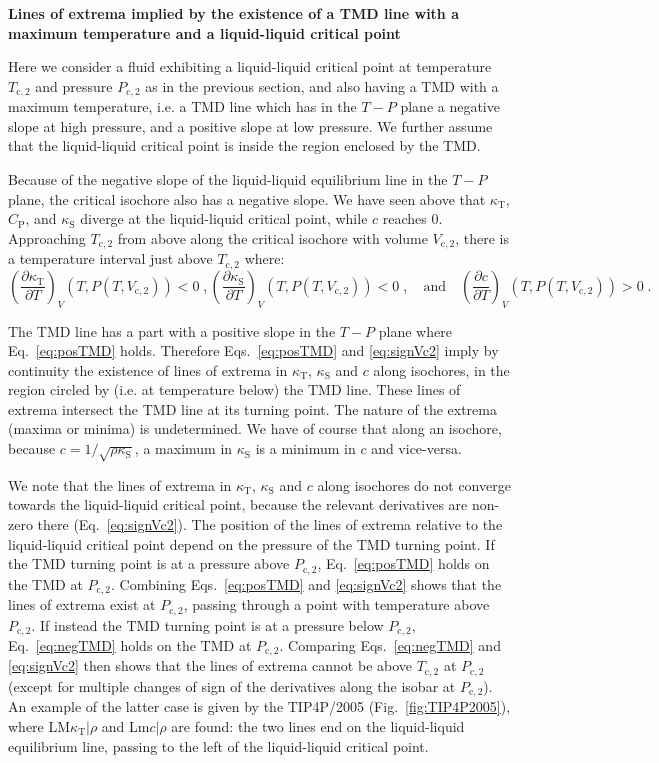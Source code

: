 \documentclass[12pt]{article}
\newcommand{\mrm}{\mathrm}
\newcommand{\kT}{\kappa_\mrm{T}}
\newcommand{\kS}{\kappa_\mrm{S}}
\newcommand{\CP}{C_\mrm{P}}
\begin{document}
\textbf{Lines of extrema implied by the existence of a TMD line with a maximum temperature and a liquid-liquid critical point}

Here we consider a fluid exhibiting a liquid-liquid critical point at temperature $T_\mrm{c,2}$ and pressure $P_\mrm{c,2}$ as in the previous section, and also having a 
TMD with a maximum temperature, i.e. a TMD line which has in the $T-P$ plane a negative slope at high pressure, and a positive slope at low pressure. We further assume that the liquid-liquid critical point is inside the region enclosed by the TMD.

Because of the negative slope of the liquid-liquid equilibrium line in the $T-P$ plane, the critical isochore also has a negative slope. We have seen above that $\kT$, $\CP$, and $\kS$ diverge at the liquid-liquid critical point, while $c$ reaches 0. Approaching $T_\mrm{c,2}$ from above along the critical isochore with volume $V_\mrm{c,2}$, there is a temperature interval just above $T_\mrm{c,2}$ where:
\begin{equation}
\left( \frac{\partial \kT}{\partial T} \right)_V (T,P(T,V_\mrm{c,2})) < 0 \; , \left( \frac{\partial \kS}{\partial T} \right)_V (T,P(T,V_\mrm{c,2})) < 0 \; , \quad\mrm{and}\quad \left( \frac{\partial c}{\partial T} \right)_V (T,P(T,V_\mrm{c,2})) > 0 \; .
\label{eq:signVc2}
\end{equation}

The TMD line has a part with a positive slope in the $T-P$ plane where Eq.~\ref{eq:posTMD} holds. Therefore Eqs.~\ref{eq:posTMD} and \ref{eq:signVc2} imply by continuity the existence of lines of extrema in $\kT$, $\kS$ and $c$ along isochores, in the region circled by (i.e. at temperature below) the TMD line. These lines of extrema intersect the TMD line at its turning point. The nature of the extrema (maxima or minima) is undetermined. We have of course that along an isochore, because $c=1/\sqrt{\rho \kS}$, a maximum in $\kS$ is a minimum in $c$ and vice-versa.

We note that the lines of extrema in $\kT$, $\kS$ and $c$ along isochores do not converge towards the liquid-liquid critical point, because the relevant derivatives are non-zero there (Eq.~\ref{eq:signVc2}). The position of the lines of extrema relative to the liquid-liquid critical point depend on the pressure of the TMD turning point. If the TMD turning point is at a pressure above $P_\mrm{c,2}$, Eq.~\ref{eq:posTMD} holds on the TMD at $P_\mrm{c,2}$. Combining Eqs.~\ref{eq:posTMD} and \ref{eq:signVc2} shows that the lines of extrema exist at $P_\mrm{c,2}$, passing through a point with temperature above $P_\mrm{c,2}$. If instead the TMD turning point is at a pressure below $P_\mrm{c,2}$, Eq.~\ref{eq:negTMD} holds on the TMD at $P_\mrm{c,2}$. Comparing Eqs.~\ref{eq:negTMD} and \ref{eq:signVc2} then shows that the lines of extrema cannot be above $T_\mrm{c,2}$ at $P_\mrm{c,2}$ (except for multiple changes of sign of the derivatives along the isobar at $P_\mrm{c,2}$). An example of the latter case is given by the TIP4P/2005 (Fig.~\ref{fig:TIP4P2005}), where LM$\kT|\rho$ and Lm$c|\rho$ are found: the two lines end on the liquid-liquid equilibrium line, passing to the left of the liquid-liquid critical point.
\end{document}
